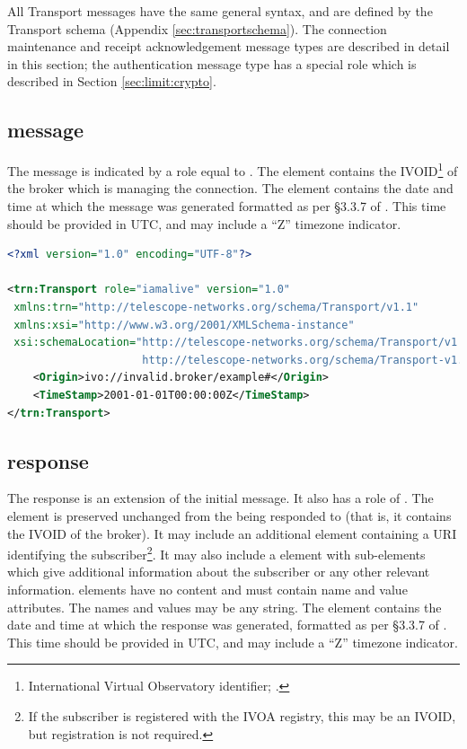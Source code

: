 \documentclass[a4paper,11pt]{ivoa}
\begin{document}
All Transport messages have the same general syntax, and are defined by the
Transport schema (Appendix \ref{sec:transportschema}). The connection
maintenance and receipt acknowledgement message types are described in detail
in this section; the authentication message type has a special role which is
described in Section \ref{sec:limit:crypto}.

\subsection{ message}
\label{sec:transport:iamalive}

The  message is indicated by a role equal to .
The  element contains the IVOID\footnote{International
Virtual Observatory identifier; \citet{std:VOID2}.} of the broker which is
managing the connection. The  element contains the date
and time at which the message was generated formatted as per \S3.3.7 of
\citet{Peterson:2012}. This time should be provided in UTC, and may include a
“Z” timezone indicator.

\begin{lstlisting}[language=xml,caption=Sample \xmlel{iamalive} message.,
                   label=lst:iamalive]
<?xml version="1.0" encoding="UTF-8"?>

<trn:Transport role="iamalive" version="1.0"
 xmlns:trn="http://telescope-networks.org/schema/Transport/v1.1"
 xmlns:xsi="http://www.w3.org/2001/XMLSchema-instance"
 xsi:schemaLocation="http://telescope-networks.org/schema/Transport/v1.1
                     http://telescope-networks.org/schema/Transport-v1.1.xsd">
    <Origin>ivo://invalid.broker/example#</Origin>
    <TimeStamp>2001-01-01T00:00:00Z</TimeStamp>
</trn:Transport>
\end{lstlisting}

\subsection{ response}
\label{sec:transport:iamaliveresponse}

The  response is an extension of the initial 
message. It also has a role of . The 
element is preserved unchanged from the  being responded to
(that is, it contains the IVOID of the broker). It may include an additional
 element containing a URI identifying the
subscriber\footnote{If the subscriber is registered with the IVOA registry,
this may be an IVOID, but registration is not required.}. It may also include
a  element with  sub-elements which give
additional information about the subscriber or any other relevant information.
 elements have no content and must contain name and value
attributes. The names and values may be any string. The 
element contains the date and time at which the response was generated,
formatted as per \S3.3.7 of \citet{Peterson:2012}. This time should be
provided in UTC, and may include a “Z” timezone indicator.
\end{document}

